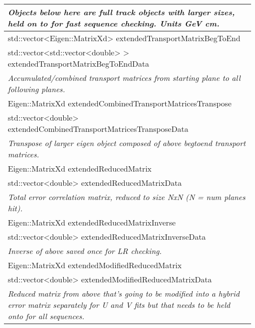 \begin{longtable}{|p{16cm}|}
\textit{Objects below here are full track objects with larger sizes, held on to for fast sequence checking. Units GeV cm.} \\ \hline

std::vector\textless{}Eigen::MatrixXd\textgreater{} extendedTransportMatrixBegToEnd \\
std::vector\textless{}std::vector\textless{}double\textgreater{} \textgreater{} extendedTransportMatrixBegToEndData \\ 
\textit{Accumulated/combined transport matrices from starting plane to all following planes.} \\ \hline

Eigen::MatrixXd extendedCombinedTransportMatricesTranspose \\
std::vector\textless{}double\textgreater{} extendedCombinedTransportMatricesTransposeData \\
\textit{Transpose of larger eigen object composed of above begtoend transport matrices.} \\ \hline

Eigen::MatrixXd extendedReducedMatrix \\
std::vector\textless{}double\textgreater{} extendedReducedMatrixData \\ 
\textit{Total error correlation matrix, reduced to size NxN (N = num planes hit).} \\ \hline

Eigen::MatrixXd extendedReducedMatrixInverse \\ 
std::vector\textless{}double\textgreater{} extendedReducedMatrixInverseData \\
\textit{Inverse of above saved once for LR checking.} \\ \hline

Eigen::MatrixXd extendedModifiedReducedMatrix \\ 
std::vector\textless{}double\textgreater{} extendedModifiedReducedMatrixData \\
\textit{Reduced matrix from above that's going to be modified into a hybrid error matrix separately for U and V fits but that needs to be held onto for all sequences.} \\ \hline


  \hline

\end{longtable}
